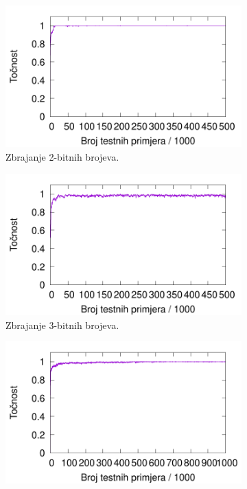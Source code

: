 \documentclass[times, utf8, zavrsni]{fer}
\begin{document}
\begin{figure}[!h]
    \centering
    \begin{subfigure}{0.496\textwidth}
        \centering
        \includegraphics[width=\textwidth]{img/carry/4care.pdf}
        \caption{Zbrajanje 2-bitnih brojeva.}
        \label{fig:4care}
    \end{subfigure}
    \begin{subfigure}{0.496\textwidth}
        \centering
        \includegraphics[width=\textwidth]{img/carry/6care.pdf}
        \caption{Zbrajanje 3-bitnih brojeva.}
        \label{fig:6care}
    \end{subfigure}
    \begin{subfigure}{0.496\textwidth}
        \centering
        \includegraphics[width=\textwidth]{img/carry/8care.pdf}

\end{subfigure}
\end{figure}
\end{document}
